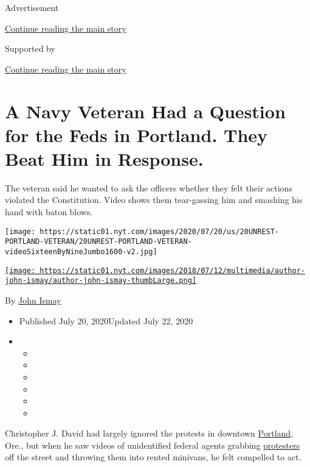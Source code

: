 Advertisement

\protect\hyperlink{after-top}{Continue reading the main story}

Supported by

\protect\hyperlink{after-sponsor}{Continue reading the main story}

\hypertarget{a-navy-veteran-had-a-question-for-the-feds-in-portland-they-beat-him-in-response}{%
\section{A Navy Veteran Had a Question for the Feds in Portland. They
Beat Him in
Response.}\label{a-navy-veteran-had-a-question-for-the-feds-in-portland-they-beat-him-in-response}}

The veteran said he wanted to ask the officers whether they felt their
actions violated the Constitution. Video shows them tear-gassing him and
smashing his hand with baton blows.

\texttt{[image: https://static01.nyt.com/images/2020/07/20/us/20UNREST-PORTLAND-VETERAN/20UNREST-PORTLAND-VETERAN-videoSixteenByNineJumbo1600-v2.jpg]}

\href{https://www.nytimes.com/by/john-ismay}{\texttt{[image: https://static01.nyt.com/images/2018/07/12/multimedia/author-john-ismay/author-john-ismay-thumbLarge.png]}}

By \href{https://www.nytimes.com/by/john-ismay}{John Ismay}

\begin{itemize}
\item
  Published July 20, 2020Updated July 22, 2020
\item
  \begin{itemize}
  \item
  \item
  \item
  \item
  \item
  \item
  \end{itemize}
\end{itemize}

Christopher J. David had largely ignored the protests in downtown
\href{https://www.nytimes.com/2020/07/21/us/portland-protests.html}{Portland},
Ore., but when he saw videos of unidentified federal agents grabbing
\href{https://www.nytimes.com/2020/07/21/us/portland-protests.html}{protesters}
off the street and throwing them into rented minivans, he felt compelled
to act.

